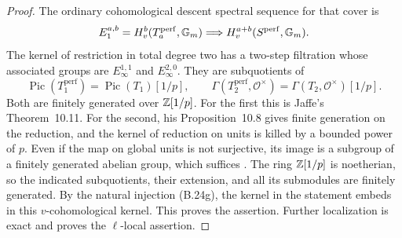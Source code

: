 \begin{proof}
The ordinary cohomological descent spectral sequence for that
cover is
\[
 E_1^{a,b}=H^b_v(T_a^{\mathrm{perf}},{\mathbb G_m})
       \Longrightarrow H^{a+b}_v(S^{\mathrm{perf}},{\mathbb G_m}).
\]
The kernel of restriction in total degree two has a two-step
filtration whose associated groups are \(E_\infty^{1,1}\)
and \(E_\infty^{2,0}\).  They are subquotients of
\[
 \operatorname{Pic}(T_1^{\mathrm{perf}})
       =\operatorname{Pic}(T_1)[1/p],\qquad
 \Gamma(T_2^{\mathrm{perf}},\mathcal O^\times)
       =\Gamma(T_2,\mathcal O^\times)[1/p].
\]
Both are finitely generated over \(\mathbb Z[1/p]\).
For the first this is Jaffe's Theorem~10.11.  For the second,
his Proposition~10.8 gives finite generation on the reduction,
and the kernel of reduction on units is killed by a bounded
power of \(p\).  Even if the map on global units is not
surjective, its image is a subgroup of a finitely generated
abelian group, which suffices
\cite[Proposition~10.8 and Theorem~10.11,
preprint pp.~42--43]{BJaffe1994}.
The ring \(\mathbb Z[1/p]\) is noetherian, so the indicated
subquotients, their extension, and all its submodules are
finitely generated.  By the natural injection (B.24g), the
kernel in the statement embeds in this \(v\)-cohomological
kernel.  This proves the assertion.  Further localization is
exact and proves the \(\ell\)-local assertion.
\end{proof}

